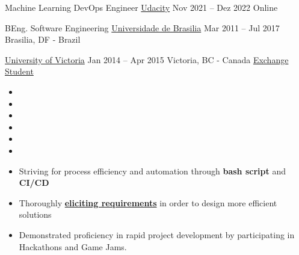 \par
{}

\cveducation
{\normalsize Machine Learning DevOps Engineer}
{\href{https://confirm.udacity.com/VWERCDCT}{Udacity}}
{Nov 2021 -- Dez 2022}
{Online}
{}

\hfill

\cveducation
{\normalsize BEng. Software Engineering}
{\href{https://fga.unb.br/software}{Universidade de Brasilia}}
{Mar 2011 -- Jul 2017}
{Brasilia, DF - Brazil}
{}

\cveducation
{}
{\href{https://www.uvic.ca/}{University of Victoria}}
{Jan 2014 -- Apr 2015}
{Victoria, BC - Canada}
{\href{http://www.cienciasemfronteiras.gov.br/web/csf/o-programa}{Exchange Student}}
\smallskip


\hfill



\begin{itemize}
\item[\scriptsize\color{midaccent}\faComments] 
\item[\scriptsize\color{midaccent}\faComments] \par
\divider
\item[\scriptsize\color{midaccent}\faCode] 
\item[\scriptsize\color{midaccent}\faCode] 
\item[\scriptsize\color{midaccent}\faCode] 
\item[\scriptsize\color{midaccent}\faCode] \par
\end{itemize}

\hfill



{\justifying\color{description}
\begin{itemize}
    \item[\color{midaccent}\faAngleRight]
        Striving for process efficiency and automation through {\bfseries\color{tech}bash script} and {\bfseries\color{tech}CI/CD}
    \item[\color{midaccent}\faAngleRight]
        Thoroughly {\bfseries\color{tech}\href{http://swebokwiki.org/Chapter_1:_Software_Requirements#Software_Requirements_Fundamentals}{eliciting requirements}} in order to design more efficient solutions
	\item[\color{midaccent}\faAngleRight]
        Demonstrated proficiency in rapid project development by participating in Hackathons and Game Jams.
\end{itemize}
}

